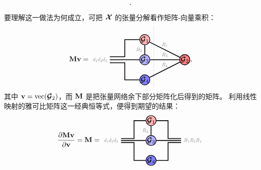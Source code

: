 \begin{itemize}
$$\begin{tikzpicture}[baseline=\baseline]
\end{tikzpicture}.
$$ 
要理解这一做法为何成立，可把 $\Xt$ 的张量分解看作矩阵-向量乘积：
$$
\Mb\vb 
=
\begin{tikzpicture}[baseline=\baseline]
    \tikzset{tensor/.style = {minimum size = 0.5cm,shape = circle,thick,draw=black,inner sep = 0pt}, edge/.style = {thick,line width=.4mm},every loop/.style={}}
    \def\y{1}
    \def\x{0}
     \node[tensor,fill=red!30!white](G_1) at (\x,\y) {$\Gt_1$};
    \node[tensor,fill=blue!30!white] (G_3) at (\x,\y-1) {$\Gt_3$};
     \node[tensor,fill=red!50!white](G_2) at (\x+2,\y-1) {$\Gt_2$};
    \node[tensor,fill=blue!50!white] (G_4) at (\x,\y-2) {$\Gt_4$};
    \node[tensor,fill=red!50!white] (G_2) at (\x+2,\y-1) {$\Gt_2$};
    \draw[edge](G_1) -- (\x-1,\y) -- (\x-1,\y-0.85) -- (\x-1.75,\y-0.85);
    \draw[edge](G_3)-- (\x-1.75,\y-1)node [left] {\scalebox{0.7}{\dimcolor{$d_1d_2d_3$}}};
    \draw[edge](G_2)--(G_1)node [midway,above] {\scalebox{0.7}{\dimcolor{$R_1$}}};
    \draw[edge](G_2)--(G_3)node [midway,above] {\scalebox{0.7}{\dimcolor{$R_3$}}};
    \draw[edge](G_1)--(G_3)node [midway,left] {\scalebox{0.7}{\dimcolor{$R_2$}}};
    \draw[edge](G_2)--(G_4)node [midway,above] {\scalebox{0.7}{\dimcolor{$R_4$}}};
    \draw[edge] (G_4) -- (\x-1,\y-2) -- (\x-1,\y-1.15) -- (\x-1.75,\y-1.15);
    \draw[dotted] (\x+0.45,\y+0.65) -- (\x+0.45,\y-2.35);
\end{tikzpicture},
$$
其中 $\vb = \vectorize(\Gt_2) $，而 $\Mb$ 是把张量网络余下部分矩阵化后得到的矩阵。 
利用线性映射的雅可比矩阵这一经典恒等式，便得到期望的结果：
$$\frac{\partial\Mb\vb}{\partial\vb} = \Mb = 
\begin{tikzpicture}[baseline=\baseline]
    \tikzset{tensor/.style = {minimum size = 0.5cm,shape = circle,thick,draw=black,inner sep = 0pt}, edge/.style = {thick,line width=.4mm},every loop/.style={}}
    \def\y{1}
    \def\x{0}
     \node[tensor,fill=red!30!white](G_1) at (\x,\y) {$\Gt_1$};
    \node[tensor,fill=blue!30!white] (G_3) at (\x,\y-1) {$\Gt_3$};
    \node[tensor,fill=blue!50!white] (G_4) at (\x,\y-2) {$\Gt_4$};
    \draw[edge](G_1) -- (\x-0.85,\y) -- (\x-0.85,\y-0.9) -- (\x-1.5,\y-0.9);
    \draw[edge](G_3)-- (\x-1.5,\y-1)node [left] {\scalebox{0.7}{\dimcolor{$d_1d_2d_3$}}};
    \draw[edge](G_1)-- (\x+0.85,\y) -- (\x+0.85,\y-0.9) -- (\x+1.5,\y-0.9);
    \draw[edge](G_3) -- (\x+1.5,\y-1) node [right] {\scalebox{0.7}{\dimcolor{$R_1R_3R_4$}}};
    \draw[edge](G_1)--(G_3)node [midway,left] {\scalebox{0.7}{\dimcolor{$R_2$}}};
    \draw[edge] (G_4) -- (\x+0.85,\y-2) -- (\x+0.85,\y-1.1) -- (\x+1.5,\y-1.1);
    \draw[edge] (G_4) -- (\x-0.85,\y-2) -- (\x-0.85,\y-1.1) -- (\x-1.5,\y-1.1);

\end{tikzpicture}$$
\end{itemize}
